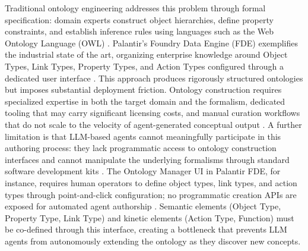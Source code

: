 Traditional ontology engineering addresses this problem through formal specification: domain experts construct object hierarchies, define property constraints, and establish inference rules using languages such as the Web Ontology Language (OWL) \cite{ref5}. Palantir's Foundry Data Engine (FDE) exemplifies the industrial state of the art, organizing enterprise knowledge around Object Types, Link Types, Property Types, and Action Types configured through a dedicated user interface \cite{ref6}. This approach produces rigorously structured ontologies but imposes substantial deployment friction. Ontology construction requires specialized expertise in both the target domain and the formalism, dedicated tooling that may carry significant licensing costs, and manual curation workflows that do not scale to the velocity of agent-generated conceptual output \cite{ref7}. A further limitation is that LLM-based agents cannot meaningfully participate in this authoring process: they lack programmatic access to ontology construction interfaces and cannot manipulate the underlying formalisms through standard software development kits \cite{ref8}. The Ontology Manager UI in Palantir FDE, for instance, requires human operators to define object types, link types, and action types through point-and-click configuration; no programmatic creation APIs are exposed for automated agent authorship \cite{ref8}. Semantic elements (Object Type, Property Type, Link Type) and kinetic elements (Action Type, Function) must be co-defined through this interface, creating a bottleneck that prevents LLM agents from autonomously extending the ontology as they discover new concepts.


